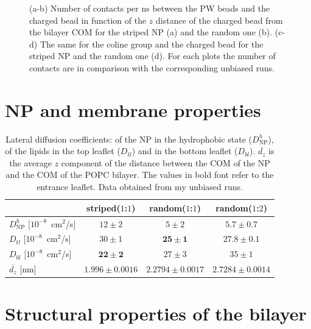 \begin{figure}[p]
{	}
	\caption{(a-b) Number of contacts per ns between the \acs{PW} beads and the charged bead in function of the $z$ distance of the charged bead from the bilayer \acs{COM} for the striped \acs{NP} (a) and the random one (b). (c-d) The same for the coline group and the charged bead for the striped \ac{NP} and the random one (d). For each plots the number of contacts are in comparison with the corresponding unbiased runs.}
\end{figure}
\restoregeometry


\section{NP and membrane properties}

\begin{table}[h!t]
	\centering
	\begin{tabular}{lccc}
		\toprule
		\,		 & striped($1$:$1$)		& random($1$:$1$)		& random($1$:$2$)					\\ \toprule
		$D^h_{\text{NP}}$ [$10^{-8}$~cm$^2$/s] & $12 \pm 2$ & $5 \pm 2$ & $5.7 \pm 0.7$ 				\\ \midrule
		$D_{tl}$ [$10^{-8}$~cm$^2$/s] & $30 \pm 1$ & $\mathbf{25 \pm 1}$ & $\mathbf{27.8 \pm 0.1}$	\\ \midrule
		$D_{bl}$ [$10^{-8}$~cm$^2$/s] & $\mathbf{22 \pm 2}$ & $27 \pm 3$	& $35 \pm 1$			\\ \midrule
		$\overline{d_z}$ [nm] & $1.996 \pm 0.0016$	& $2.2794 \pm 0.0017$	& $2.7284 \pm 0.0014$	\\ \bottomrule
	\end{tabular}
	\caption{Lateral diffusion coefficients: of the \acs{NP} in the hydrophobic state ($D^h_\text{NP}$), of the lipids in the top leaflet ($D_{tl}$) and in the bottom leaflet ($D_{bl}$). $\overline{d_z}$ is the average $z$ component of the distance between the \acs{COM} of the \acs{NP} and the \acs{COM} of the \acs{POPC} bilayer. The values in bold font refer to the entrance leaflet. Data obtained from my unbiased runs.}
	\label{tab:NPMembProperties}
\end{table}


\section{Structural properties of the bilayer}
